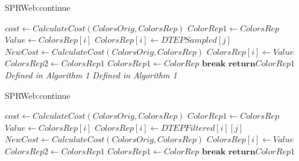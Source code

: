 \begin{algorithm}[!htb]
\caption{SPRWeb:continue}\label{SPRWeb:continue}
\begin{algorithmic}[1]
\State $cost \gets CalculateCost(ColorsOrig,ColorsRep)$
\State $ColorRep1 \gets ColorsRep$  
			\State $Value \gets ColorsRep[i]$
			\State $ColorsRep[i] \gets DTEPSampled[j]$ 
			\State $NewCost \gets CalculateCost(ColorsOrig,ColorsRep)$  
	        		\State $ColorsRep[i] \gets Value$ 
	        	\EndIf
	        \EndFor
	      \EndFor
	\State $ColorsRep2 \gets ColorsRep1$
	\State $ColorsRep1 \gets ColorRep$
		\State $\textbf{break}$
	\EndIf
\EndWhile
\State $\textbf{return}  ColorRep1$
\EndProcedure
{}
\State \textit{Defined in Algorithm 1}
\EndProcedure
{}
\State \textit{Defined in Algorithm 1}
\EndProcedure
{}
\end{algorithmic}
\end{algorithm}

\begin{algorithm}[!htb]
\caption{SPRWeb:continue}\label{SPRWeb:continue2}
\begin{algorithmic}[1]
\State $cost \gets CalculateCost(ColorsOrig,ColorsRep)$
\State $ColorRep1 \gets ColorsRep$  
			\State $Value \gets ColorsRep[i]$
			\State $ColorsRep[i] \gets DTEPFiltered[i][j]$ 
			\State $NewCost \gets CalculateCost(ColorsOrig,ColorsRep)$  
	        		\State $ColorsRep[i]\gets Value$ 
	        	\EndIf
	        \EndFor
	      \EndFor
	\State $ColorsRep2 \gets ColorsRep1$
	\State $ColorsRep1 \gets ColorRep$
		\State $\textbf{break}$
	\EndIf
\EndWhile
\State $\textbf{return}  ColorRep1$
\EndProcedure
{}
\end{algorithmic}
\end{algorithm}


